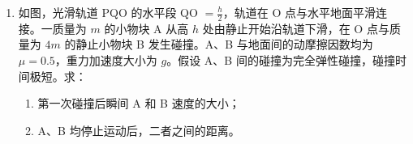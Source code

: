 \documentclass[\gkver]{gaokaozhenti}
\begin{document}
\begin{enumerate}
{	（1）找圆心，画轨迹，求半径，如图所示：


	设粒子在磁场中运动半径为 $R$，由几何关系得：$R + \sqrt{R^{2} + r^{2}} = 3r$

	易得 $R = \frac{4}{3}r$。

	（2）设进入磁场时速度的大小为 $v$，由洛伦兹力公式和牛顿第二定律有

	$qvB = \frac{mv^{2}}{R}$

	进入圆形区域，带电粒子做匀速直线运动，则

	$2r = vt$

	联立解得 $t = \frac{3m}{2qB}$。
}

\item
如图，光滑轨道 PQO 的水平段 QO $= \frac{h}{2}$，轨道在 O 点与水平地面平滑连接。一质量为 $m$ 的小物块 A 从高 $h$ 处由静止开始沿轨道下滑，在 O 点与质量为 $4m$ 的静止小物块 B 发生碰撞。A、B 与地面间的动摩擦因数均为 $\mu = 0.5$，重力加速度大小为 $g$。假设 A、B 间的碰撞为完全弹性碰撞，碰撞时间极短。求：

\begin{enumerate}
	\item
	第一次碰撞后瞬间 A 和 B 速度的大小；
	\item
	A、B 均停止运动后，二者之间的距离。
\end{enumerate}


\end{enumerate}
\end{document}
